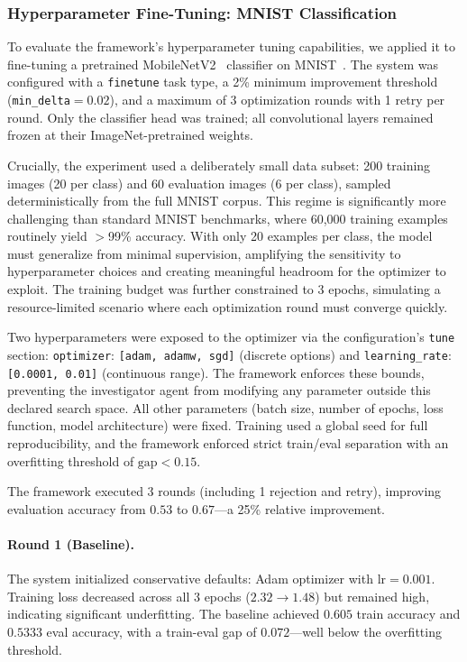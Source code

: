 \subsubsection{Hyperparameter Fine-Tuning: MNIST Classification}
\label{sec:experiment-mnist}

To evaluate the framework's hyperparameter tuning capabilities, we applied it to fine-tuning a pretrained MobileNetV2~\cite{sandler2018mobilenetv2} classifier on MNIST~\cite{lecun1998gradient}. The system was configured with a \texttt{finetune} task type, a 2\% minimum improvement threshold (\texttt{min\_delta}${}= 0.02$), and a maximum of 3 optimization rounds with 1 retry per round. Only the classifier head was trained; all convolutional layers remained frozen at their ImageNet-pretrained weights.

Crucially, the experiment used a deliberately small data subset: 200 training images (20 per class) and 60 evaluation images (6 per class), sampled deterministically from the full MNIST corpus. This regime is significantly more challenging than standard MNIST benchmarks, where 60{,}000 training examples routinely yield $>$99\% accuracy. With only 20 examples per class, the model must generalize from minimal supervision, amplifying the sensitivity to hyperparameter choices and creating meaningful headroom for the optimizer to exploit. The training budget was further constrained to 3 epochs, simulating a resource-limited scenario where each optimization round must converge quickly.

Two hyperparameters were exposed to the optimizer via the configuration's \texttt{tune} section: \texttt{optimizer}: \texttt{[adam, adamw, sgd]} (discrete options) and \texttt{learning\_rate}: \texttt{[0.0001, 0.01]} (continuous range). The framework enforces these bounds, preventing the investigator agent from modifying any parameter outside this declared search space. All other parameters (batch size, number of epochs, loss function, model architecture) were fixed. Training used a global seed for full reproducibility, and the framework enforced strict train/eval separation with an overfitting threshold of $\text{gap} < 0.15$.

The framework executed 3 rounds (including 1 rejection and retry), improving evaluation accuracy from $0.53$ to $0.67$---a 25\% relative improvement.

\paragraph{Round 1 (Baseline).}
The system initialized conservative defaults: Adam optimizer with $\text{lr} = 0.001$. Training loss decreased across all 3 epochs ($2.32 \to 1.48$) but remained high, indicating significant underfitting. The baseline achieved $0.605$ train accuracy and $0.5333$ eval accuracy, with a train-eval gap of $0.072$---well below the overfitting threshold.

